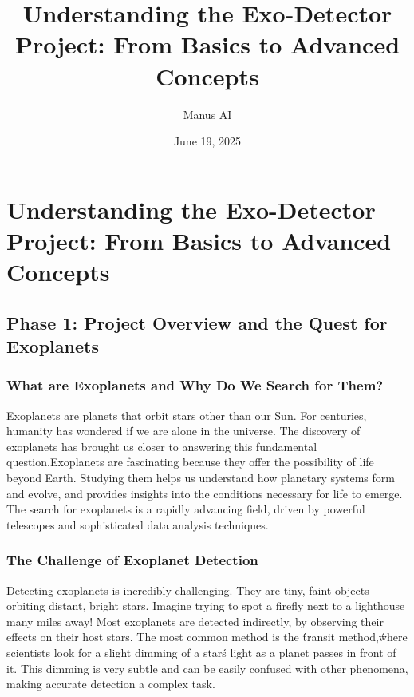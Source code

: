 \documentclass{article}
\title{Understanding the Exo-Detector Project: From Basics to Advanced Concepts}
\author{Manus AI}
\date{June 19, 2025}
\begin{document}
\maketitle

\tableofcontents

\newpage




\section{Understanding the Exo-Detector Project: From Basics to Advanced Concepts}

\subsection{Phase 1: Project Overview and the Quest for Exoplanets}

\subsubsection{What are Exoplanets and Why Do We Search for Them?}

Exoplanets are planets that orbit stars other than our Sun. For centuries, humanity has wondered if we are alone in the universe. The discovery of exoplanets has brought us closer to answering this fundamental question.Exoplanets are fascinating because they offer the possibility of life beyond Earth. Studying them helps us understand how planetary systems form and evolve, and provides insights into the conditions necessary for life to emerge. The search for exoplanets is a rapidly advancing field, driven by powerful telescopes and sophisticated data analysis techniques.

\subsubsection{The Challenge of Exoplanet Detection}

Detecting exoplanets is incredibly challenging. They are tiny, faint objects orbiting distant, bright stars. Imagine trying to spot a firefly next to a lighthouse many miles away! Most exoplanets are detected indirectly, by observing their effects on their host stars. The most common method is the \'transit method,\' where scientists look for a slight dimming of a star\'s light as a planet passes in front of it. This dimming is very subtle and can be easily confused with other phenomena, making accurate detection a complex task.
\end{document}
